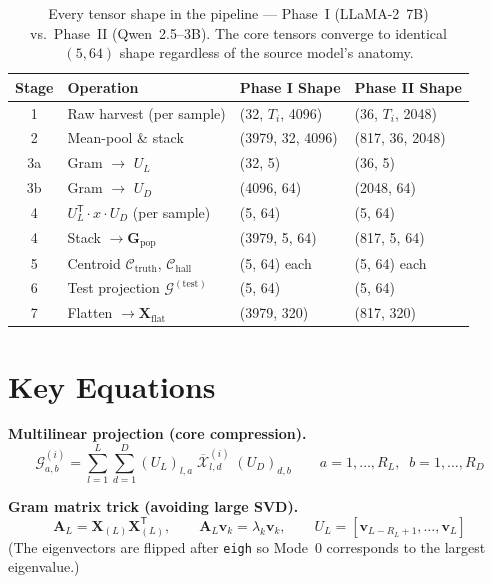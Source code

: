 \documentclass[11pt,a4paper]{article}
\begin{document}
\begin{table}[H]
\centering
\begin{tabular}{c>{\ttfamily}l>{\ttfamily}l>{\ttfamily}l}
\toprule
\textbf{Stage} & \textbf{Operation} & \textbf{Phase I Shape} & \textbf{Phase II Shape} \\
\midrule
1 & Raw harvest (per sample)           & (32, $T_i$, 4096)   & (36, $T_i$, 2048) \\
2 & Mean-pool \& stack                 & (3979, 32, 4096)    & (817, 36, 2048) \\
3a & Gram $\rightarrow$ $U_L$          & (32, 5)             & (36, 5) \\
3b & Gram $\rightarrow$ $U_D$          & (4096, 64)          & (2048, 64) \\
4 & $U_L^{\mathsf{T}} \cdot x \cdot U_D$ (per sample) & (5, 64) & (5, 64) \\
4 & Stack $\rightarrow \mathbf{G}_{\text{pop}}$ & (3979, 5, 64) & (817, 5, 64) \\
5 & Centroid $\mathcal{C}_{\text{truth}}$, $\mathcal{C}_{\text{hall}}$ & (5, 64) each & (5, 64) each \\
6 & Test projection $\mathcal{G}^{(\text{test})}$ & (5, 64) & (5, 64) \\
7 & Flatten $\rightarrow \mathbf{X}_{\text{flat}}$ & (3979, 320) & (817, 320) \\
\bottomrule
\end{tabular}
\caption{Every tensor shape in the pipeline — Phase~I (LLaMA-2~7B) vs.\ 
         Phase~II (Qwen~2.5--3B).  The core tensors converge to identical
         $(5, 64)$ shape regardless of the source model's anatomy.}
\end{table}

\section{Key Equations}

\noindent
\textbf{Multilinear projection (core compression).}
\begin{equation}
\mathcal{G}^{(i)}_{a,b}
   = \sum_{l=1}^{L} \sum_{d=1}^{D}
     (U_L)_{l,a} \;
     \overline{\mathcal{X}}^{(i)}_{l,d} \;
     (U_D)_{d,b}
   \qquad
   a = 1,\dots,R_L,\;\; b = 1,\dots,R_D
\end{equation}

\noindent
\textbf{Gram matrix trick (avoiding large SVD).}
\begin{equation}
\mathbf{A}_L = \mathbf{X}_{(L)} \mathbf{X}_{(L)}^{\mathsf{T}},\qquad
\mathbf{A}_L \mathbf{v}_k = \lambda_k \mathbf{v}_k,\qquad
U_L = [\mathbf{v}_{L-R_L+1},\dots,\mathbf{v}_{L}]
\end{equation}
(The eigenvectors are flipped after \texttt{eigh} so Mode~0 corresponds to
the largest eigenvalue.)
\end{document}

